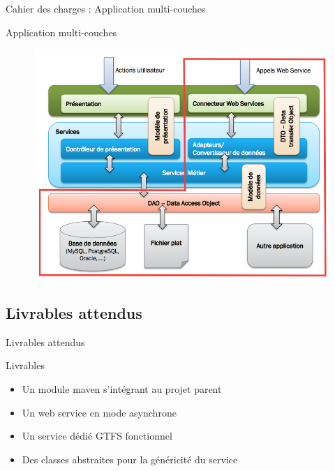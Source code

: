 \documentclass[utf8,compress]{beamer}
\begin{document}
\begin{frame}{Cahier des charges : Application multi-couches}
\begin{block}{Application multi-couches}
\begin{figure}[h]
    \center
    \includegraphics[scale=0.3]{images/WebAppArchitecture2.png}
\end{figure}
\end{block}
\end{frame}
\subsection{Livrables attendus}
\begin{frame}{Livrables attendus}
\begin{block}{Livrables}
\begin{itemize}
\item Un module maven s'intégrant au projet parent
\item Un web service en mode asynchrone
\item Un service dédié GTFS fonctionnel
\item Des classes abstraites pour la généricité du service
\end{itemize}
\end{block}
\end{frame}

\end{document}
